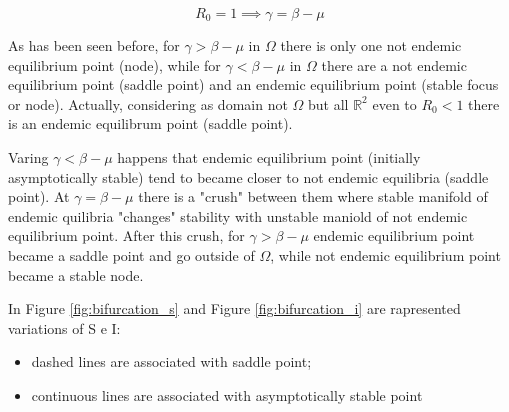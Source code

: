 \begin{equation}
    R_0 = 1 \implies \gamma =  \beta - \mu
\end{equation}

As has been seen before, for $\gamma > \beta-\mu$ in $\Omega$ there is only one not endemic equilibrium point (node), while for $\gamma < \beta-\mu$ in $\Omega$ there are a not endemic equilibrium point (saddle point) and an endemic equilibrium point (stable focus or node). Actually, considering as domain not $\Omega$ but all $\mathbb{R}^2$ even to $R_0 < 1$ there is an endemic equilibrum point (saddle point).

Varing $\gamma < \beta-\mu$ happens that endemic equilibrium point (initially asymptotically stable) tend to became closer to not endemic equilibria (saddle point). At $\gamma = \beta-\mu$ there is a "crush" between them where stable manifold of endemic quilibria "changes" stability with unstable maniold of not endemic equilibrium point.
After this crush, for $\gamma > \beta-\mu$ endemic equilibrium point became a saddle point and go outside of $\Omega$, while not endemic equilibrium point became a stable node.

In Figure \ref{fig:bifurcation_s} and Figure \ref{fig:bifurcation_i} are rapresented variations of S e I:
\begin{itemize}
    \item dashed lines are associated with saddle point;
    \item continuous lines are associated with asymptotically stable point
\end{itemize}

